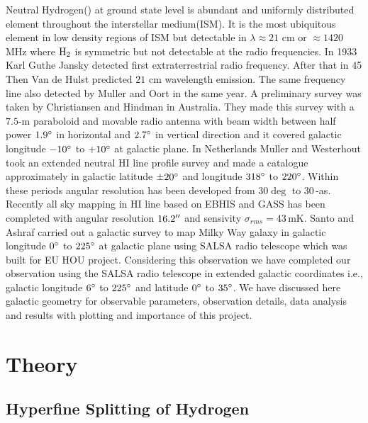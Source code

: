 \documentclass[fleqn,usenatbib]{mnras}
\begin{document}
Neutral Hydrogen() at ground state level is abundant and uniformly distributed element throughout the interstellar medium(ISM). It is the most ubiquitous element in low density regions of ISM but detectable in $\lambda\approx21$ cm or $\approx1420$ MHz where $\textnormal{H}_2$ is symmetric but not detectable at the radio frequencies. In 1933 Karl Guthe Jansky detected first extraterrestrial radio frequency\citep{jansky1933radio}. After that in 45 Then Van de Hulst predicted $21$ cm wavelength emission\citep{CJBakker1945}. The same frequency line also detected by Muller and Oort\citep{muller1951observation} in the same year. A preliminary survey was taken by Christiansen and Hindman\citep{christiansen1952preliminary} in Australia. They made this survey with a $7.5$\textnormal{-m} paraboloid and movable radio antenna with beam width between half power $1.9\hbox{$^\circ$}$ in horizontal and $2.7\hbox{$^\circ$}$ in vertical direction and it covered galactic longitude $-10\hbox{$^\circ$}$ to $+10\hbox{$^\circ$}$ at galactic plane. In Netherlands Muller and Westerhout\citep{Muller1957} took an extended neutral HI line profile survey and made a catalogue approximately in galactic latitude $\pm20\hbox{$^\circ$}$ and longitude $318\hbox{$^\circ$}$ to $220\hbox{$^\circ$}$. Within these periods angular resolution has been developed from $30\deg$ to $30$\,-\micro as\citep{kellermann2001development,Middelberg2008}. Recently all sky mapping in HI line based on EBHIS and GASS has been completed\citep{bekhti2016hi4pi} with angular resolution $16.2\hbox{$^{\prime\prime}$}$ and sensivity $\sigma_{rms}=43$\,mK. Santo and Ashraf\citep{santo2013mapping} carried out a galactic survey to map Milky Way galaxy in galactic longitude $0\hbox{$^\circ$}$ to $225\hbox{$^\circ$}$ at galactic plane using SALSA radio telescope which was built for EU HOU project\citep{Doran2007}. Considering this observation we have completed our observation using the SALSA radio telescope in extended galactic coordinates i.e., galactic longitude $6\hbox{$^\circ$}$ to $225\hbox{$^\circ$}$ and latitude $0\hbox{$^\circ$}$ to $35\hbox{$^\circ$}$. We have discussed here galactic geometry for observable parameters, observation details, data analysis and results with plotting and importance of this project.

\section{Theory}

\subsection{Hyperfine Splitting of Hydrogen}
\end{document}
